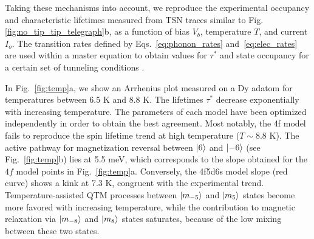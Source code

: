\documentclass[
reprint,amsmath,amssymb,aps]{revtex4-2}
\begin{document}
Taking these mechanisms into account, we reproduce the experimental occupancy and characteristic lifetimes measured from TSN traces similar to Fig. \ref{fig:no_tip_tip_telegraph}b, as a function of bias $V_{b}$, temperature $T$, and current $I_{o}$. The transition rates defined by Eqs.~\ref{eq:phonon_rates} and~\ref{eq:elec_rates} are used within a master equation to obtain values for $\tau^*$ and state occupancy for a certain set of tunneling conditions \cite{delgado2010,Khajetoorians2013,loth2010,cervetti2016}.

In Fig.~\ref{fig:temp}a, we show an Arrhenius plot measured on a Dy adatom for temperatures between 6.5 K and 8.8 K. The lifetimes $\tau^*$ decrease exponentially with increasing temperature.
The parameters of each model have been optimized independently in order to obtain the best agreement. Most notably, the 4f model fails to reproduce the spin lifetime trend at high temperature ($T\sim 8.8$ K). The active pathway for magnetization reversal between $\ket{6}$ and $\ket{-6}$ (see Fig.~\ref{fig:temp}b) lies at 5.5 meV, which corresponds to the slope obtained for the $4f$ model points in Fig.~\ref{fig:temp}a. Conversely, the 4f5d6s model slope (red curve) shows a kink at 7.3 K, congruent with the experimental trend. Temperature-assisted QTM processes between $\ket{m_{-5}}$ and $\ket{m_{5}}$ states become more favored with increasing temperature, while the contribution to magnetic relaxation via $\ket{m_{-8}}$ and $\ket{m_{8}}$ states saturates, because of the low mixing between these two states.
\end{document}
